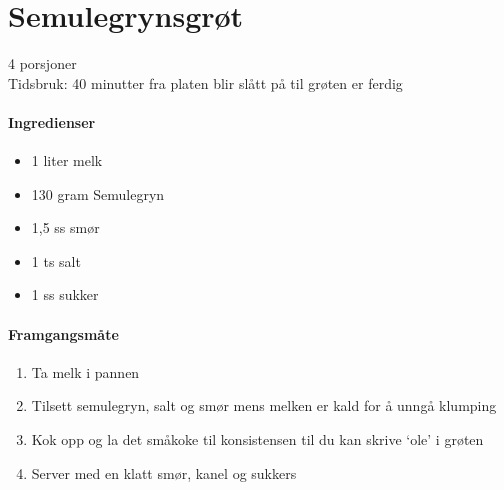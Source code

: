 \section{﻿Semulegrynsgrøt}
4 porsjoner\\
Tidsbruk: 40 minutter fra platen blir slått på til grøten er ferdig

\paragraph{Ingredienser}
\begin{itemize}[noitemsep]
	\item 1 liter melk
	\item 130 gram Semulegryn
	\item 1,5 ss smør
	\item 1 ts salt
	\item 1 ss sukker
\end{itemize}

\paragraph{Framgangsmåte}
\begin{enumerate}[noitemsep]
	\item Ta melk i pannen
	\item Tilsett semulegryn, salt og smør mens melken er kald for å unngå klumping
	\item Kok opp og la det småkoke til konsistensen til du kan skrive `ole' i grøten
	\item Server med en klatt smør, kanel og sukkers
\end{enumerate}
